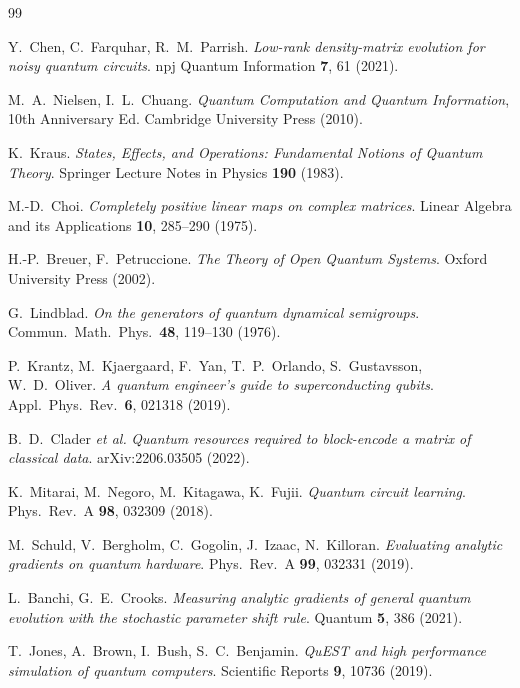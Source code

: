 \documentclass[11pt,a4paper]{article}
\begin{document}
\begin{thebibliography}{99}

  Y.~Chen, C.~Farquhar, R.~M.~Parrish.
  \textit{Low-rank density-matrix evolution for noisy quantum circuits}.
  npj Quantum Information \textbf{7}, 61 (2021).

  M.~A.~Nielsen, I.~L.~Chuang.
  \textit{Quantum Computation and Quantum Information}, 10th Anniversary Ed.
  Cambridge University Press (2010).

  K.~Kraus.
  \textit{States, Effects, and Operations: Fundamental Notions of Quantum Theory}.
  Springer Lecture Notes in Physics \textbf{190} (1983).

  M.-D.~Choi.
  \textit{Completely positive linear maps on complex matrices}.
  Linear Algebra and its Applications \textbf{10}, 285--290 (1975).

  H.-P.~Breuer, F.~Petruccione.
  \textit{The Theory of Open Quantum Systems}. Oxford University Press (2002).

  G.~Lindblad.
  \textit{On the generators of quantum dynamical semigroups}.
  Commun.\ Math.\ Phys.\ \textbf{48}, 119--130 (1976).

  P.~Krantz, M.~Kjaergaard, F.~Yan, T.~P.~Orlando, S.~Gustavsson, W.~D.~Oliver.
  \textit{A quantum engineer's guide to superconducting qubits}.
  Appl.\ Phys.\ Rev.\ \textbf{6}, 021318 (2019).

  B.~D.~Clader \textit{et al.}
  \textit{Quantum resources required to block-encode a matrix of classical data}.
  arXiv:2206.03505 (2022).

  K.~Mitarai, M.~Negoro, M.~Kitagawa, K.~Fujii.
  \textit{Quantum circuit learning}.
  Phys.\ Rev.\ A \textbf{98}, 032309 (2018).

  M.~Schuld, V.~Bergholm, C.~Gogolin, J.~Izaac, N.~Killoran.
  \textit{Evaluating analytic gradients on quantum hardware}.
  Phys.\ Rev.\ A \textbf{99}, 032331 (2019).

  L.~Banchi, G.~E.~Crooks.
  \textit{Measuring analytic gradients of general quantum evolution with the
  stochastic parameter shift rule}.
  Quantum \textbf{5}, 386 (2021).

  T.~Jones, A.~Brown, I.~Bush, S.~C.~Benjamin.
  \textit{QuEST and high performance simulation of quantum computers}.
  Scientific Reports \textbf{9}, 10736 (2019).


\end{thebibliography}
\end{document}
